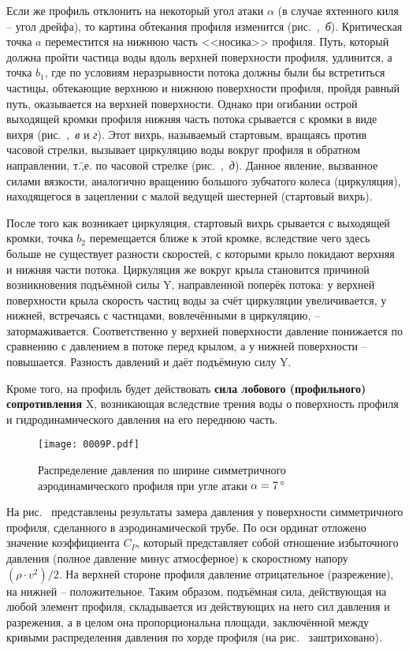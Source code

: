 Если же профиль отклонить на некоторый угол атаки $\alpha$ (в случае
яхтенного киля \--- угол дрейфа), то картина обтекания профиля
изменится (рис.~,~\textit{б}). Критическая точка $a$
переместится на нижнюю часть <<носика>> профиля. Путь, который должна
пройти частица воды вдоль верхней поверхности профиля, удлинится, а
точка $b_1$, где по условиям неразрывности потока должны были бы
встретиться частицы, обтекающие верхнюю и нижнюю поверхности профиля,
пройдя равный путь, оказывается на верхней поверхности. Однако при
огибании острой выходящей кромки профиля нижняя часть потока срывается
с кромки в виде вихря (рис.~,~\textit{в} и \textit{г}). Этот
вихрь, называемый стартовым, вращаясь против часовой стрелки, вызывает
циркуляцию воды вокруг профиля в обратном направлении, т.\=,е. по
часовой стрелке (рис.~,~\textit{д}). Данное явление, вызванное
силами вязкости, аналогично вращению большого зубчатого колеса
(циркуляция), находящегося в зацеплении с малой ведущей шестерней
(стартовый вихрь).

После того как возникает циркуляция, стартовый вихрь срывается с
выходящей кромки, точка $b_2$ перемещается ближе к этой кромке,
вследствие чего здесь больше не существует разности скоростей, с
которыми крыло покидают верхняя и нижняя части потока. Циркуляция же
вокруг крыла становится причиной возникновения подъёмной силы \ve Y,
направленной поперёк потока: у верхней поверхности крыла скорость
частиц воды за счёт циркуляции увеличивается, у нижней, встречаясь с
частицами, вовлечёнными в циркуляцию, \---
затормаживается. Соответственно у верхней поверхности давление
понижается по сравнению с давлением в потоке перед крылом, а у нижней
поверхности \--- повышается. Разность давлений и даёт подъёмную силу
\ve Y.

Кроме того, на профиль будет действовать \textbf{сила лобового (профильного) сопротивления}
\ve X, возникающая вследствие трения
воды о поверхность профиля и гидродинамического давления на его
переднюю часть.

\begin{figure}[htb]
  \centering
  \texttt{[image: 0009P.pdf]}
  \caption{Распределение давления по ширине симметричного аэродинамического профиля при угле атаки $\alpha = 7\,^\circ$}
  \label{fig:9}
\end{figure}

На рис.~ представлены результаты замера давления у поверхности
симметричного профиля, сделанного в аэродинамической трубе. По оси
ординат отложено значение коэффициента $C_P$, который представляет
собой отношение избыточного давления (полное давление минус
атмосферное) к скоростному напору $(\rho \cdot v^2) / 2$. На верхней
стороне профиля давление отрицательное (разрежение), на нижней \---
положительное. Таким образом, подъёмная сила, действующая на любой
элемент профиля, складывается из действующих на него сил давления и
разрежения, а в целом она пропорциональна площади, заключённой между
кривыми распределения давления по хорде профиля (на рис.~
заштриховано).

